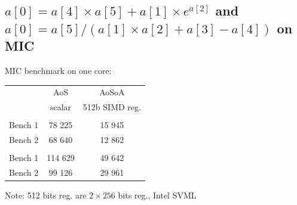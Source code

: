 \documentclass{beamer}
\begin{document}
\subsection*{$a[0] = a[4] \times a[5] + a[1] \times e^{a[2]}$ and $a[0] = a[5]/(a[1] \times a[2]+a[3]-a[4])$ on MIC}
\begin{frame}[fragile]
\centering
MIC benchmark on one core:
\vspace{0.5cm}

\begin{tabular}{ c c  |  c }
      & AoS & AoSoA\\
                            & scalar & 512b SIMD reg. \\                            
                           \hline
        \color{C0}{float}                    &  &  \\
   Bench 1  & 78 225 & \cellcolor{C2}15 945 \\
   Bench 2  & 68 640 & \cellcolor{C2}12 862  \\
      \hline
        \color{C0}{double}                    &  &  \\
        Bench 1  & 114 629 & \cellcolor{C2}49 642 \\
   Bench 2  & 99 126 &\cellcolor{C2} 29 961  \\
\hline
\end{tabular}
\vspace{0.5cm}

Note: 512 bits reg. are $2 \times 256$ bits reg., Intel SVML



\end{frame}

\end{document}
